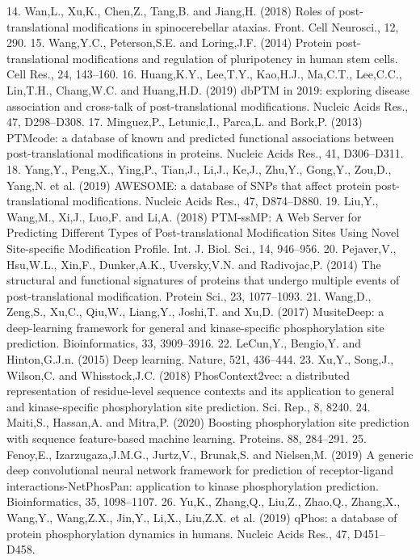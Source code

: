 14. Wan,L., Xu,K., Chen,Z., Tang,B. and Jiang,H. (2018) Roles of
post-translational modifications in spinocerebellar ataxias. Front.
Cell Neurosci., 12, 290.
15. Wang,Y.C., Peterson,S.E. and Loring,J.F. (2014) Protein
post-translational modifications and regulation of pluripotency in
human stem cells. Cell Res., 24, 143–160.
16. Huang,K.Y., Lee,T.Y., Kao,H.J., Ma,C.T., Lee,C.C., Lin,T.H.,
Chang,W.C. and Huang,H.D. (2019) dbPTM in 2019: exploring
disease association and cross-talk of post-translational modifications.
Nucleic Acids Res., 47, D298–D308.
17. Minguez,P., Letunic,I., Parca,L. and Bork,P. (2013) PTMcode: a
database of known and predicted functional associations between
post-translational modifications in proteins. Nucleic Acids Res., 41,
D306–D311.
18. Yang,Y., Peng,X., Ying,P., Tian,J., Li,J., Ke,J., Zhu,Y., Gong,Y.,
Zou,D., Yang,N. et al. (2019) AWESOME: a database of SNPs that
affect protein post-translational modifications. Nucleic Acids Res., 47,
D874–D880.
19. Liu,Y., Wang,M., Xi,J., Luo,F. and Li,A. (2018) PTM-ssMP: A Web
Server for Predicting Different Types of Post-translational
Modification Sites Using Novel Site-specific Modification Profile. Int.
J. Biol. Sci., 14, 946–956.
20. Pejaver,V., Hsu,W.L., Xin,F., Dunker,A.K., Uversky,V.N. and
Radivojac,P. (2014) The structural and functional signatures of
proteins that undergo multiple events of post-translational
modification. Protein Sci., 23, 1077–1093.
21. Wang,D., Zeng,S., Xu,C., Qiu,W., Liang,Y., Joshi,T. and Xu,D.
(2017) MusiteDeep: a deep-learning framework for general and
kinase-specific phosphorylation site prediction. Bioinformatics, 33,
3909–3916.
22. LeCun,Y., Bengio,Y. and Hinton,G.J.n. (2015) Deep learning. Nature,
521, 436–444.
23. Xu,Y., Song,J., Wilson,C. and Whisstock,J.C. (2018)
PhosContext2vec: a distributed representation of residue-level
sequence contexts and its application to general and kinase-specific
phosphorylation site prediction. Sci. Rep., 8, 8240.
24. Maiti,S., Hassan,A. and Mitra,P. (2020) Boosting phosphorylation
site prediction with sequence feature-based machine learning.
Proteins. 88, 284–291.
25. Fenoy,E., Izarzugaza,J.M.G., Jurtz,V., Brunak,S. and Nielsen,M.
(2019) A generic deep convolutional neural network framework for
prediction of receptor-ligand interactions-NetPhosPan: application
to kinase phosphorylation prediction. Bioinformatics, 35, 1098–1107.
26. Yu,K., Zhang,Q., Liu,Z., Zhao,Q., Zhang,X., Wang,Y., Wang,Z.X.,
Jin,Y., Li,X., Liu,Z.X. et al. (2019) qPhos: a database of protein
phosphorylation dynamics in humans. Nucleic Acids Res., 47,
D451–D458.
